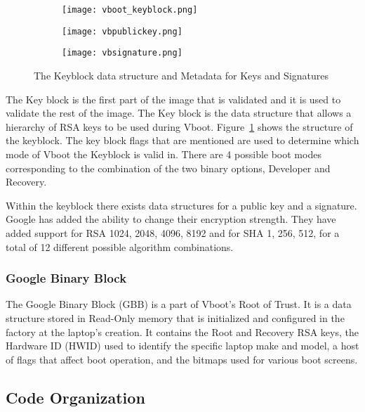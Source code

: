 \documentclass[../report.tex]{subfiles}
\begin{document}
\begin{figure}
\begin{subfigure}{.5\textwidth}
  \centering
  \texttt{[image: vboot\_keyblock.png]}
\end{subfigure}
\begin{subfigure}{.20\textwidth}
  \centering
  \texttt{[image: vbpublickey.png]}
\end{subfigure}
\begin{subfigure}{.20\textwidth}
  \centering
  \texttt{[image: vbsignature.png]}
\end{subfigure}
\caption{The Keyblock data structure and Metadata for Keys and Signatures}
\label{fig:vboot_keyblock}
\end{figure}

The Key block is the first part of the image that is validated and it is used to validate the rest of the image.
The Key block is the data structure that allows a hierarchy of RSA keys to be used during Vboot.
Figure~\ref{fig:vboot_keyblock} shows the structure of the keyblock. 
The key block flags that are mentioned are used to determine which mode of Vboot the Keyblock is valid in. 
There are 4 possible boot modes corresponding to the combination of the two binary options, Developer and Recovery.

Within the keyblock there exists data structures for a public key and a signature.
Google has added the ability to change their encryption strength.
They have added support for RSA 1024, 2048, 4096, 8192 and for SHA 1, 256, 512, for a total of 12 different possible algorithm combinations.

\subsubsection{Google Binary Block}

The Google Binary Block (GBB) is a part of Vboot's Root of Trust.
It is a data structure stored in Read-Only memory that is initialized and configured in the factory at the laptop's creation.
It contains the Root and Recovery RSA keys, the Hardware ID (HWID) used to identify the specific laptop make and model, a host of flags that affect boot operation, and the bitmaps used for various boot screens.

\subsection{Code Organization}
\end{document}
